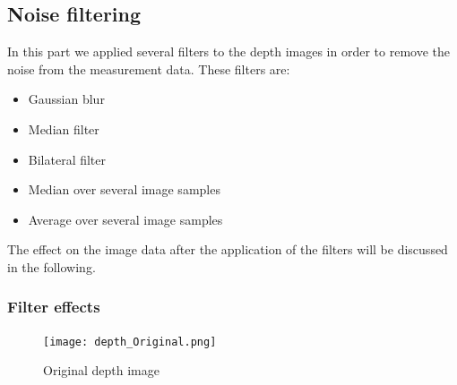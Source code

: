 \documentclass[DIV12,a4paper]{scrartcl}
\begin{document}
\newpage
\subsection{Noise filtering}
\label{sec:filtering}
In this part we applied several filters to the depth images in order to remove the noise from the measurement data. These filters are:
\begin{itemize}
\item Gaussian blur
\item Median filter
\item Bilateral filter
\item Median over several image samples
\item Average over several image samples
\end{itemize}
The effect on the image data after the application of the filters will be discussed in the following.


\subsubsection{Filter effects}
\label{sec:filter_effects}
\begin{figure}[h!tbp]
  \centering
  \texttt{[image: depth\_Original.png]}
  \caption{Original depth image}
  \label{fig:original_depth}
\end{figure}
\end{document}
